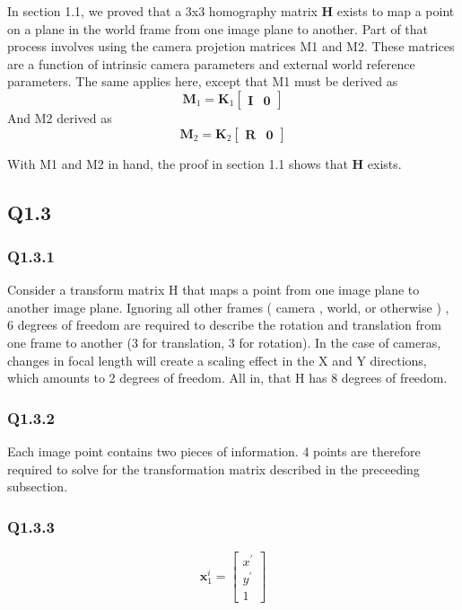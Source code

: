 \documentclass[12pt]{article}
\begin{document}
In section 1.1, we proved that a 3x3 homography matrix $\textbf{H}$ exists to map a point on a plane in the world frame from one image plane to another. Part of that process involves using the camera projetion matrices M1 and M2. These matrices are a function of intrinsic camera parameters and external world reference parameters.
The same applies here, except that M1 must be derived as  
$$
\textbf{M}_{1} = 
\textbf{K}_{1} 
\begin{bmatrix}
\textbf{I} & \textbf{0}
\end{bmatrix}
$$
And M2 derived as
$$
\textbf{M}_{2} = 
\textbf{K}_{2} 
\begin{bmatrix}
\textbf{R} & \textbf{0}
\end{bmatrix}
$$

With M1 and M2 in hand, the proof in section 1.1 shows that $\textbf{H}$ exists.

\newpage
\subsection{Q1.3}
\subsubsection{Q1.3.1}
Consider a transform matrix H that maps a point from one image plane to another image plane. Ignoring all other frames ( camera , world, or otherwise ) , 6 degrees of freedom are required to describe the rotation and translation from one frame to another (3 for translation, 3 for rotation). In the case of cameras, changes in focal length will create a scaling effect in the X and Y directions, which amounts to 2 degrees of freedom. All in, that H has 8 degrees of freedom.

\subsubsection{Q1.3.2}
Each image point contains two pieces of information. 4 points are therefore required to solve for the transformation matrix described in the preceeding subsection.

\subsubsection{Q1.3.3}
$$
\textbf{x}^{i}_{1}=
\begin{bmatrix}
x^{ \prime } \\ y ^ { \prime } \\ 1
\end{bmatrix}
$$
\end{document}
